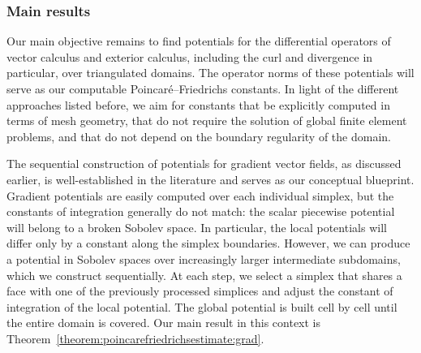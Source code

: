 \documentclass[10pt,a4paper]{article}
\begin{document}
\subsubsection{Main results}



Our main objective remains to find potentials for the differential operators of vector calculus and exterior calculus, including the curl and divergence in particular, over triangulated domains. 
The operator norms of these potentials will serve as our computable Poincar\'e--Friedrichs constants.
In light of the different approaches listed before, 
we aim for constants that be explicitly computed in terms of mesh geometry, that do not require the solution of global finite element problems, 
and that do not depend on the boundary regularity of the domain. 




The sequential construction of potentials for gradient vector fields, as discussed earlier, is well-established in the literature and serves as our conceptual blueprint. 
Gradient potentials are easily computed over each individual simplex, but the constants of integration generally do not match: 
the scalar piecewise potential will belong to a broken Sobolev space. 
In particular, the local potentials will differ only by a constant along the simplex boundaries. 
However, we can produce a potential in Sobolev spaces over increasingly larger intermediate subdomains, which we construct sequentially. 
At each step, we select a simplex that shares a face with one of the previously processed simplices and adjust the constant of integration of the local potential. 
The global potential is built cell by cell until the entire domain is covered. 
Our main result in this context is Theorem~\ref{theorem:poincarefriedrichsestimate:grad}.
\end{document}

